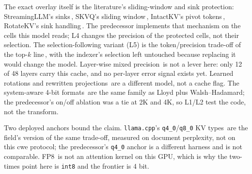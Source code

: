 \documentclass[10pt,twocolumn]{article}
\begin{document}
The exact overlay itself is the literature's sliding-window and sink protection: StreamingLLM's sinks\,\cite{streamingllm}, SKVQ's sliding window\,\cite{skvq}, IntactKV's pivot tokens\,\cite{intactkv}, RotateKV's sink handling\,\cite{rotatekv}. The predecessor implements that mechanism on the cells this model reads; L4 changes the precision of the protected cells, not their selection. The selection-following variant (L5) is the token/precision trade-off of the top-$k$ line\,\cite{top-k}, with the indexer's selection left untouched because replacing it would change the model. Layer-wise mixed precision\,\cite{kvtuner} is not a lever here: only 12 of 48 layers carry this cache, and no per-layer error signal exists yet. Learned rotations and rewritten projections\,\cite{quarot,spinquant,palu} are a different model, not a cache flag. The system-aware 4-bit formats\,\cite{sawint4} are the same family as Lloyd plus Walsh--Hadamard; the predecessor's on/off ablation was a tie at 2K and 4K, so L1/L2 test the code, not the transform.

Two deployed anchors bound the claim. \texttt{llama.cpp}'s \texttt{q4\_0}/\texttt{q8\_0} KV types\,\cite{llama-cpp} are the field's version of the same trade-off, measured on document perplexity, not on this cwe protocol; the predecessor's \texttt{q4\_0} anchor is a different harness and is not comparable. FP8\,\cite{vllm-fp8} is not an attention kernel on this GPU, which is why the two-times point here is \texttt{int8} and the frontier is 4 bit.
\end{document}

